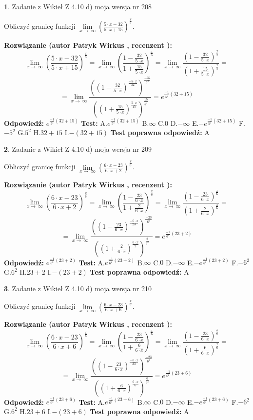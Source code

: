 \documentclass[12pt, a4paper]{article}
\theoremstyle{definition} %
\newtheorem{zad}{}
\newcommand{\zadStart}[1]{\begin{zad}#1\newline}
\newcommand{\zadStop}{\end{zad}}
\newcommand{\rozwStart}[2]{\noindent \textbf{Rozwiązanie (autor #1 , recenzent #2): }\newline}
\newcommand{\rozwStop}{\newline}
\newcommand{\odpStart}{\noindent \textbf{Odpowiedź:}\newline}
\newcommand{\odpStop}{\newline}
\newcommand{\testStart}{\noindent \textbf{Test:}\newline}
\newcommand{\testStop}{\newline}
\newcommand{\kluczStart}{\noindent \textbf{Test poprawna odpowiedź:}\newline}
\newcommand{\kluczStop}{\newline}
\begin{document}
\zadStart{Zadanie z Wikieł Z 4.10 d) moja wersja nr 208}


Obliczyć granicę funkcji  $\lim\limits_{x\to\ \infty}(\frac{5\cdot x-32}{5\cdot x+15})^{\frac{x}{5}}$.
\zadStop
\rozwStart{Patryk Wirkus}{}
$$\lim\limits_{x\to\ \infty}(\frac{5\cdot x-32}{5\cdot x+15})^{\frac{x}{5}} = \lim\limits_{x\to\ \infty}(\frac{1-\frac{32}{5\cdot x}}{1+\frac{15}{5\cdot x}})^{\frac{x}{5}}=\lim\limits_{x\to\ \infty}\frac{(1-\frac{32}{5\cdot x})^{\frac{x}{5}}}{(1+\frac{15}{5\cdot x})^{\frac{x}{5}}}=$$
$$=\lim\limits_{x\to\ \infty}\frac{((1-\frac{32}{5\cdot x})^{\frac{-5\cdot x}{32}})^{\frac{-32}{5^{2}}}}{((1+\frac{15}{5\cdot x})^{\frac{5\cdot x}{15}})^{\frac{15}{5^{2}}}}=e^{\frac{-1}{5^{2}}(32+15)}$$
\rozwStop
\odpStart
$e^{\frac{-1}{5^{2}}(32+15)}$
\odpStop
\testStart
A.$e^{\frac{-1}{5^{2}}(32+15)}$ B.$\infty$ C.$0$ D.$-\infty$ E.$-e^{\frac{-1}{5^{2}}(32+15)}$
F.$-5^{2}$ G.$5^{2}$
H.$32+15$
I.$-(32+15)$
\testStop
\kluczStart
A
\kluczStop



\zadStart{Zadanie z Wikieł Z 4.10 d) moja wersja nr 209}


Obliczyć granicę funkcji  $\lim\limits_{x\to\ \infty}(\frac{6\cdot x-23}{6\cdot x+2})^{\frac{x}{6}}$.
\zadStop
\rozwStart{Patryk Wirkus}{}
$$\lim\limits_{x\to\ \infty}(\frac{6\cdot x-23}{6\cdot x+2})^{\frac{x}{6}} = \lim\limits_{x\to\ \infty}(\frac{1-\frac{23}{6\cdot x}}{1+\frac{2}{6\cdot x}})^{\frac{x}{6}}=\lim\limits_{x\to\ \infty}\frac{(1-\frac{23}{6\cdot x})^{\frac{x}{6}}}{(1+\frac{2}{6\cdot x})^{\frac{x}{6}}}=$$
$$=\lim\limits_{x\to\ \infty}\frac{((1-\frac{23}{6\cdot x})^{\frac{-6\cdot x}{23}})^{\frac{-23}{6^{2}}}}{((1+\frac{2}{6\cdot x})^{\frac{6\cdot x}{2}})^{\frac{2}{6^{2}}}}=e^{\frac{-1}{6^{2}}(23+2)}$$
\rozwStop
\odpStart
$e^{\frac{-1}{6^{2}}(23+2)}$
\odpStop
\testStart
A.$e^{\frac{-1}{6^{2}}(23+2)}$ B.$\infty$ C.$0$ D.$-\infty$ E.$-e^{\frac{-1}{6^{2}}(23+2)}$
F.$-6^{2}$ G.$6^{2}$
H.$23+2$
I.$-(23+2)$
\testStop
\kluczStart
A
\kluczStop



\zadStart{Zadanie z Wikieł Z 4.10 d) moja wersja nr 210}


Obliczyć granicę funkcji  $\lim\limits_{x\to\ \infty}(\frac{6\cdot x-23}{6\cdot x+6})^{\frac{x}{6}}$.
\zadStop
\rozwStart{Patryk Wirkus}{}
$$\lim\limits_{x\to\ \infty}(\frac{6\cdot x-23}{6\cdot x+6})^{\frac{x}{6}} = \lim\limits_{x\to\ \infty}(\frac{1-\frac{23}{6\cdot x}}{1+\frac{6}{6\cdot x}})^{\frac{x}{6}}=\lim\limits_{x\to\ \infty}\frac{(1-\frac{23}{6\cdot x})^{\frac{x}{6}}}{(1+\frac{6}{6\cdot x})^{\frac{x}{6}}}=$$
$$=\lim\limits_{x\to\ \infty}\frac{((1-\frac{23}{6\cdot x})^{\frac{-6\cdot x}{23}})^{\frac{-23}{6^{2}}}}{((1+\frac{6}{6\cdot x})^{\frac{6\cdot x}{6}})^{\frac{6}{6^{2}}}}=e^{\frac{-1}{6^{2}}(23+6)}$$
\rozwStop
\odpStart
$e^{\frac{-1}{6^{2}}(23+6)}$
\odpStop
\testStart
A.$e^{\frac{-1}{6^{2}}(23+6)}$ B.$\infty$ C.$0$ D.$-\infty$ E.$-e^{\frac{-1}{6^{2}}(23+6)}$
F.$-6^{2}$ G.$6^{2}$
H.$23+6$
I.$-(23+6)$
\testStop
\kluczStart
A
\kluczStop
\end{document}

